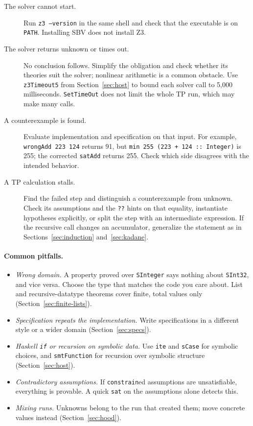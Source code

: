 \documentclass[acmsmall,screen,review,anonymous,nonacm]{acmart}
\newcommand{\code}[1]{\texttt{#1}}
\begin{document}
\begin{description}
\item[The solver cannot start.] Run \code{z3 --version} in the same shell and
  check that the executable is on \code{PATH}. Installing SBV does not install Z3.
\item[The solver returns unknown or times out.] No conclusion follows.
  Simplify the obligation and check whether its theories suit the solver;
  nonlinear arithmetic is a common obstacle. Use \code{z3Timeout5} from
  Section~\ref{sec:host} to bound each solver call to 5,000 milliseconds.
  \code{SetTimeOut} does not limit the whole TP run, which may make many calls.
\item[A counterexample is found.] Evaluate implementation and specification on
  that input. For example, \code{wrongAdd 223 124} returns 91, but
  \code{min 255 (223 + 124 :: Integer)} is 255; the corrected \code{satAdd}
  returns 255. Check which side disagrees with the intended behavior.
\item[A TP calculation stalls.] Find the failed step and distinguish a
  counterexample from unknown. Check its assumptions and the \code{??} hints
  on that equality, instantiate hypotheses explicitly, or split the step with
  an intermediate expression. If the recursive call changes an accumulator,
  generalize the statement as in Sections~\ref{sec:induction} and~\ref{sec:kadane}.
\end{description}

\paragraph{Common pitfalls.}
\begin{itemize}
\item \emph{Wrong domain.} A property proved over \code{SInteger} says nothing
  about \code{SInt32}, and vice versa. Choose the type that matches the code you
  care about. List and recursive-datatype theorems cover finite, total values only
  (Section~\ref{sec:finite-lists}).
\item \emph{Specification repeats the implementation.} Write specifications in a
  different style or a wider domain (Section~\ref{sec:specs}).
\item \emph{Haskell \code{if} or recursion on symbolic data.} Use \code{ite} and
  \code{sCase} for symbolic choices, and \code{smtFunction} for recursion over
  symbolic structure (Section~\ref{sec:host}).
\item \emph{Contradictory assumptions.} If \code{constrain}ed assumptions are
  unsatisfiable, everything is provable. A quick \code{sat} on the assumptions
  alone detects this.
\item \emph{Mixing runs.} Unknowns belong to the run that created
them; move concrete values instead (Section~\ref{sec:hood}).
\end{itemize}
\end{document}

